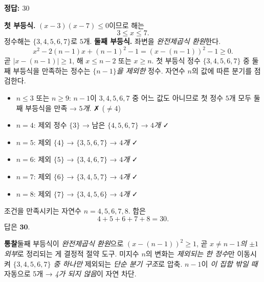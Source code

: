 \documentclass[10pt]{article}
\newcommand{\solnote}[1]{\par\smallskip\noindent
  \begin{tcolorbox}[enhanced, breakable, colback=vB-light, colframe=vB-light,
    boxrule=0pt, arc=3pt, left=10pt, right=10pt, top=4pt, bottom=4pt,
    fontupper=\sffamily\footnotesize\color{vB-ink}]
    \textbf{\color{vB-deep}통찰}\quad #1
  \end{tcolorbox}}
\begin{document}

\begin{answerbox}\sffamily\bfseries 정답: $30$\end{answerbox}
 \textbf{첫 부등식.} $(x - 3)(x - 7) \le 0$이므로 해는
\[ 3 \le x \le 7. \]
정수해는 $\{3, 4, 5, 6, 7\}$로 $5$개.
 \textbf{둘째 부등식.} 좌변을 \emph{완전제곱식 환원}한다.
\[ x^2 - 2(n - 1)x + (n - 1)^2 - 1 = (x - (n - 1))^2 - 1 \ge 0. \]
곧 $|x - (n - 1)| \ge 1$, 해 $x \le n - 2$ 또는 $x \ge n$.
 첫 부등식 정수 $\{3, 4, 5, 6, 7\}$ 중 둘째 부등식을 만족하는 정수는 \emph{$\{n - 1\}$을 제외한} 정수.
 자연수 $n$의 값에 따른 분기를 점검한다.
\begin{itemize}\setlength{\itemsep}{0pt}
\item $n \le 3$ 또는 $n \ge 9$: $n - 1$이 $3, 4, 5, 6, 7$ 중 어느 값도 아니므로 첫 정수 $5$개 모두 둘째 부등식을 만족 → \emph{$5$개}. ✗ ($\ne 4$)
\item $n = 4$: 제외 정수 $\{3\}$ → 남은 $\{4, 5, 6, 7\}$ → \emph{$4$개} ✓
\item $n = 5$: 제외 $\{4\}$ → $\{3, 5, 6, 7\}$ → \emph{$4$개} ✓
\item $n = 6$: 제외 $\{5\}$ → $\{3, 4, 6, 7\}$ → \emph{$4$개} ✓
\item $n = 7$: 제외 $\{6\}$ → $\{3, 4, 5, 7\}$ → \emph{$4$개} ✓
\item $n = 8$: 제외 $\{7\}$ → $\{3, 4, 5, 6\}$ → \emph{$4$개} ✓
\end{itemize}
 조건을 만족시키는 자연수 $n = 4, 5, 6, 7, 8$. 합은
\[ 4 + 5 + 6 + 7 + 8 = 30. \]
답은 $\textbf{30}$.
\solnote{둘째 부등식이 \emph{완전제곱식 환원}으로 $(x - (n - 1))^2 \ge 1$, 곧 \emph{$x \ne n - 1$의 $\pm 1$ 외부}로 정리되는 게 결정적 절약 도구. 미지수 $n$의 변화는 \emph{제외되는 한 정수}만 이동시켜 \emph{$\{3, 4, 5, 6, 7\}$ 중 하나만} 제외되는 \emph{단순 분기 구조}로 압축. $n - 1$이 \emph{이 집합 밖일 때} 자동으로 5개 → \emph{4가 되지 않음}이 자연 차단.}
\end{document}
